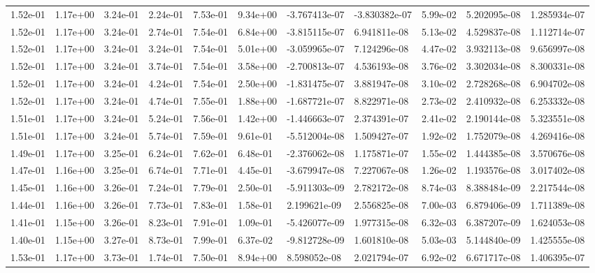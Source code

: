 \begin{longtable}{| p{} | p{} |}
1.52e-01 & 1.17e+00 & 3.24e-01 & 2.24e-01 & 7.53e-01 & 9.34e+00 & -3.767413e-07 & -3.830382e-07 &  5.99e-02 &  5.202095e-08 &  1.285934e-07 \\
1.52e-01 & 1.17e+00 & 3.24e-01 & 2.74e-01 & 7.54e-01 & 6.84e+00 & -3.815115e-07 &  6.941811e-08 &  5.13e-02 &  4.529837e-08 &  1.112714e-07 \\
1.52e-01 & 1.17e+00 & 3.24e-01 & 3.24e-01 & 7.54e-01 & 5.01e+00 & -3.059965e-07 &  7.124296e-08 &  4.47e-02 &  3.932113e-08 &  9.656997e-08 \\
1.52e-01 & 1.17e+00 & 3.24e-01 & 3.74e-01 & 7.54e-01 & 3.58e+00 & -2.700813e-07 &  4.536193e-08 &  3.76e-02 &  3.302034e-08 &  8.300331e-08 \\
1.52e-01 & 1.17e+00 & 3.24e-01 & 4.24e-01 & 7.54e-01 & 2.50e+00 & -1.831475e-07 &  3.881947e-08 &  3.10e-02 &  2.728268e-08 &  6.904702e-08 \\
1.52e-01 & 1.17e+00 & 3.24e-01 & 4.74e-01 & 7.55e-01 & 1.88e+00 & -1.687721e-07 &  8.822971e-08 &  2.73e-02 &  2.410932e-08 &  6.253332e-08 \\
1.51e-01 & 1.17e+00 & 3.24e-01 & 5.24e-01 & 7.56e-01 & 1.42e+00 & -1.446663e-07 &  2.374391e-07 &  2.41e-02 &  2.190144e-08 &  5.323551e-08 \\
1.51e-01 & 1.17e+00 & 3.24e-01 & 5.74e-01 & 7.59e-01 & 9.61e-01 & -5.512004e-08 &  1.509427e-07 &  1.92e-02 &  1.752079e-08 &  4.269416e-08 \\
1.49e-01 & 1.17e+00 & 3.25e-01 & 6.24e-01 & 7.62e-01 & 6.48e-01 & -2.376062e-08 &  1.175871e-07 &  1.55e-02 &  1.444385e-08 &  3.570676e-08 \\
1.47e-01 & 1.16e+00 & 3.25e-01 & 6.74e-01 & 7.71e-01 & 4.45e-01 & -3.679947e-08 &  7.227067e-08 &  1.26e-02 &  1.193576e-08 &  3.017402e-08 \\
1.45e-01 & 1.16e+00 & 3.26e-01 & 7.24e-01 & 7.79e-01 & 2.50e-01 & -5.911303e-09 &  2.782172e-08 &  8.74e-03 &  8.388484e-09 &  2.217544e-08 \\
1.44e-01 & 1.16e+00 & 3.26e-01 & 7.73e-01 & 7.83e-01 & 1.58e-01 &  2.199621e-09 &  2.556825e-08 &  7.00e-03 &  6.879406e-09 &  1.711389e-08 \\
1.41e-01 & 1.15e+00 & 3.26e-01 & 8.23e-01 & 7.91e-01 & 1.09e-01 & -5.426077e-09 &  1.977315e-08 &  6.32e-03 &  6.387207e-09 &  1.624053e-08 \\
1.40e-01 & 1.15e+00 & 3.27e-01 & 8.73e-01 & 7.99e-01 & 6.37e-02 & -9.812728e-09 &  1.601810e-08 &  5.03e-03 &  5.144840e-09 &  1.425555e-08 \\
1.53e-01 & 1.17e+00 & 3.73e-01 & 1.74e-01 & 7.50e-01 & 8.94e+00 &  8.598052e-08 &  2.021794e-07 &  6.92e-02 &  6.671717e-08 &  1.406395e-07 \\

\end{longtable}
